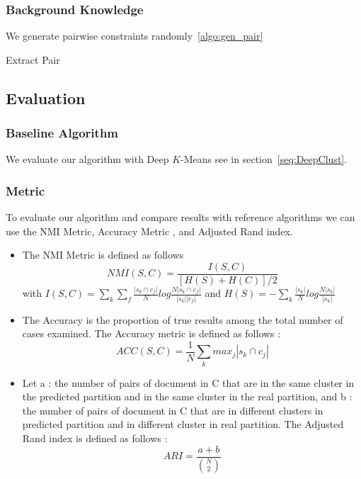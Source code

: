 \subsubsection{Background Knowledge}
We generate pairwise constraints randomly~\ref{algo:gen_pair}
\begin{algorithm}[!h]
  \caption{\label{algo:gen_pair}Extract Pair}
\end{algorithm}
\subsection{Evaluation}
\subsubsection{Baseline Algorithm}
We evaluate our algorithm with Deep $K$-Means see in section~\ref{seq:DeepClust}.
\subsubsection{Metric}
To evaluate our algorithm and compare results with reference algorithms we can
use the NMI Metric, Accuracy Metric \cite{NMI_ACC}, and Adjusted
Rand index\cite{ARI}. 
\begin{itemize}
\item The NMI Metric is defined as follows
$$NMI(S,C) = \frac{I(S,C)}{[H(S)+H(C)]/2}$$ 
with
$I(S,C) =\sum_k \sum_f\frac{|s_k \cap c_f|}{N}log\frac{N|s_k \cap c_f|}{|s_k| |c_f|}$
and
$H(S) = -\sum_k\frac{|s_k|}{N}log\frac{N|s_k|}{|s_k|}$
\item The Accuracy is the proportion of true results among the total
  number of cases examined. The Accuracy metric is defined as follows :
$$
ACC(S,C) = \frac{1}{N}\sum_k {max}_j|s_k \cap c_j|
$$
\item Let a : the number of pairs of document in C
  that are in the same cluster in the predicted partition and in the
  same cluster in the real partition, and b : the number of pairs of
  document in C that are in different clusters in predicted partition
  and in different cluster in real partition.
  The Adjusted Rand index is defined as follows :
  $$ARI = \frac{a+b}{\binom{N}{2}}$$
\end{itemize}
